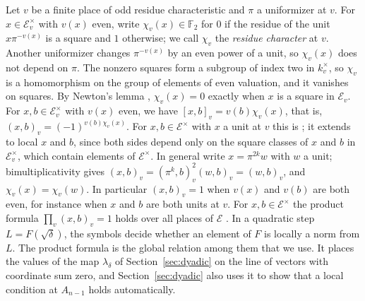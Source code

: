 \documentclass[11pt]{article}
\theoremstyle{plain}
\theoremstyle{definition}
\theoremstyle{remark}
\newcommand{\F}{\mathbb F}
\begin{document}
Let $v$ be a finite place of odd residue characteristic and $\pi$ a
uniformizer at $v$.  For $x\in\mathcal E_v^\times$ with $v(x)$ even, write
$\chi_v(x)\in\F_2$ for $0$ if the residue of the unit $x\pi^{-v(x)}$ is a
square and $1$ otherwise; we call $\chi_v$ the \emph{residue character}
at $v$.  Another uniformizer changes $\pi^{-v(x)}$ by an even power of a
unit, so $\chi_v(x)$ does not depend on $\pi$.  The nonzero squares form a
subgroup of index two in $k_v^\times$, so $\chi_v$ is a homomorphism on
the group of elements of even valuation, and it vanishes on squares.  By
Newton's lemma \cite[Theorem~7.32]{MilneANT}, $\chi_v(x)=0$ exactly when
$x$ is a square in $\mathcal E_v$.  For $x,b\in\mathcal E_v^\times$ with
$v(x)$ even, we have $[x,b]_v=v(b)\chi_v(x)$, that is,
$(x,b)_v=(-1)^{v(b)\chi_v(x)}$.  For $x,b\in\mathcal E^\times$ with $x$ a
unit at $v$ this is \cite[Chapter~VIII, 5.8]{MilneCFT}; it extends to
local $x$ and $b$, since both sides depend only on the square classes of
$x$ and $b$ in $\mathcal E_v^\times$, which contain elements of
$\mathcal E^\times$.  In general write $x=\pi^{2k}w$ with $w$ a unit;
bimultiplicativity gives $(x,b)_v=(\pi^k,b)_v^2(w,b)_v=(w,b)_v$, and
$\chi_v(x)=\chi_v(w)$.  In particular $(x,b)_v=1$ when $v(x)$ and $v(b)$
are both even, for instance when $x$ and $b$ are both units at $v$.
For $x,b\in\mathcal E^\times$ the product formula $\prod_v(x,b)_v=1$ holds
over all places of $\mathcal E$ \cite[Chapter~V, Example~5.4]{MilneCFT}.
In a quadratic step $L=F(\sqrt \delta)$, the symbols decide whether an
element of $F$ is locally a norm from $L$.  The product formula is the
global relation among them that we use.
It places the values of the map $\lambda_\delta$ of
Section~\ref{sec:dyadic} on the line of vectors with coordinate sum zero,
and Section~\ref{sec:dyadic} also uses it to show that a local condition at
$A_{n-1}$ holds automatically.
\end{document}
